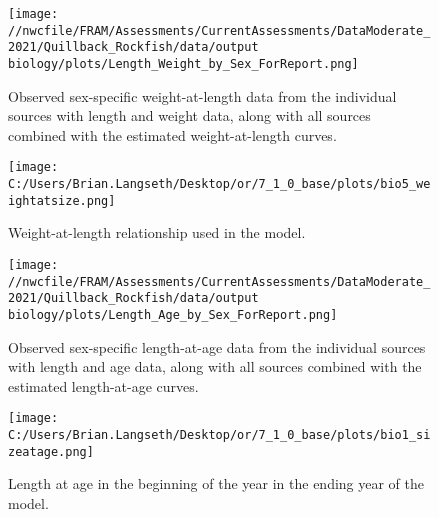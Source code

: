 \documentclass[11pt,
  english,
  a4paper,
]{article}
\begin{document}
\begin{figure}
\centering
\texttt{[image: //nwcfile/FRAM/Assessments/CurrentAssessments/DataModerate\_2021/Quillback\_Rockfish/data/output biology/plots/Length\_Weight\_by\_Sex\_ForReport.png]}
\caption{Observed sex-specific weight-at-length data from the individual sources with length and weight data, along with all sources combined with the estimated weight-at-length curves.\label{fig:len-weight-survey}}
\end{figure}

\tagmcend\tagstructend


\begin{figure}
\centering
\texttt{[image: C:/Users/Brian.Langseth/Desktop/or/7\_1\_0\_base/plots/bio5\_weightatsize.png]}
\caption{Weight-at-length relationship used in the model.\label{fig:len-weight}}
\end{figure}

\tagmcend\tagstructend


\begin{figure}
\centering
\texttt{[image: //nwcfile/FRAM/Assessments/CurrentAssessments/DataModerate\_2021/Quillback\_Rockfish/data/output biology/plots/Length\_Age\_by\_Sex\_ForReport.png]}
\caption{Observed sex-specific length-at-age data from the individual sources with length and age data, along with all sources combined with the estimated length-at-age curves.\label{fig:len-age-data}}
\end{figure}

\tagmcend\tagstructend


\begin{figure}
\centering
\texttt{[image: C:/Users/Brian.Langseth/Desktop/or/7\_1\_0\_base/plots/bio1\_sizeatage.png]}
\caption{Length at age in the beginning of the year in the ending year of the model.\label{fig:len-age-ss}}
\end{figure}
\end{document}
